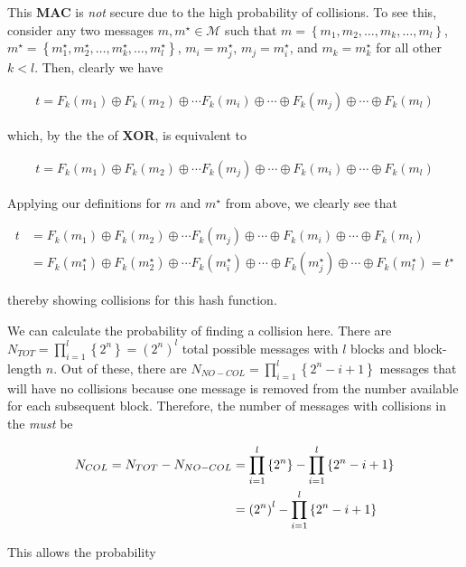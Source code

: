 \documentclass[../midterm.tex]{subfiles}
\begin{document}
\begin{flushleft}




  This \textbf{MAC} is \emph{not} secure due to the high probability of collisions.  To see this, consider any two messages $m, m^\star \in \mathcal{M}$ such that $m = \left\{ m_1, m_2, \dots, m_k, \dots, m_l \right\}$, $m^\star = \left\{ m_1^\star, m_2^\star, \dots, m_k^\star, \dots, m_l^\star \right\}$, $m_i = m^\star_j$, $m_j = m^\star_i$, and $m_k = m^\star_k$ for all other $k < l$.  Then, clearly we have

\begin{align*}
t = F_k \left( m_1 \right) \oplus F_k \left( m_2 \right) \oplus \cdots F_k \left( m_i \right) \oplus \cdots \oplus F_k \left( m_j \right) \oplus \cdots \oplus F_k \left( m_l \right)
\end{align*}

which, by the the of \textbf{XOR}, is equivalent to 

\begin{align*}
t = F_k \left( m_1 \right) \oplus F_k \left( m_2 \right) \oplus \cdots F_k \left( m_j \right) \oplus \cdots \oplus F_k \left( m_i \right) \oplus \cdots \oplus F_k \left( m_l \right)
\end{align*}

Applying our definitions for $m$ and $m^\star$ from above, we clearly see that

\begin{align*}
t &= F_k \left( m_1 \right) \oplus F_k \left( m_2 \right) \oplus \cdots F_k \left( m_j \right) \oplus \cdots \oplus F_k \left( m_i \right) \oplus \cdots \oplus F_k \left( m_l \right) \\
&= F_k \left( m^\star_1 \right) \oplus F_k \left( m^\star_2 \right) \oplus \cdots F_k \left( m^\star_i \right) \oplus \cdots \oplus F_k \left( m^\star_j \right) \oplus \cdots \oplus F_k \left( m^\star_l \right) = t^\star
\end{align*}

thereby showing collisions for this hash function. \newline

We can calculate the probability of finding a collision here.  There are $N_{TOT} = \prod_{i = 1}^l \left\{ 2^n \right\} = \left( 2^n \right)^l$ total possible messages with $l$ blocks and block-length $n$.  Out of these, there are $N_{NO-COL} = \prod_{i = 1}^l \left\{ 2^n - i + 1 \right\}$ messages that will have no collisions because one message is removed from the number available for each subsequent block. Therefore, the number of messages with collisions in the \emph{must} be

\begin{align}
N_{COL} = N_{TOT} - N_{NO-COL} &= \prod_{i = 1}^l \left\{ 2^n \right\} - \prod_{i = 1}^l \left\{ 2^n - i + 1 \right\} \notag \\
&= \left( 2^n \right)^l - \prod_{i = 1}^l \left\{ 2^n - i + 1 \right\}
\end{align}


This allows the probability  




\end{flushleft}
\end{document}
